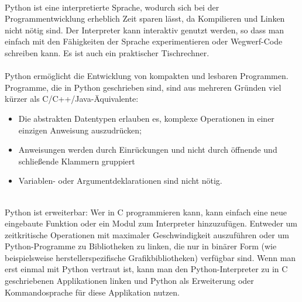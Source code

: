 \\
Python ist eine interpretierte Sprache, wodurch sich bei der Programmentwicklung erheblich Zeit sparen lässt, da Kompilieren und Linken nicht nötig sind. Der Interpreter kann interaktiv genutzt werden, so dass man einfach mit den Fähigkeiten der Sprache experimentieren oder Wegwerf-Code schreiben kann. Es ist auch ein praktischer Tischrechner.\\
\\
Python ermöglicht die Entwicklung von kompakten und lesbaren Programmen. Programme, die in Python geschrieben sind, sind aus mehreren Gründen viel kürzer als C/C++/Java-Äquivalente:\\

\begin{itemize}
\item Die abstrakten Datentypen erlauben es, komplexe Operationen in einer einzigen Anweisung auszudrücken;
\item Anweisungen werden durch Einrückungen und nicht durch öffnende und schließende Klammern gruppiert
\item Variablen- oder Argumentdeklarationen sind nicht nötig.
\end{itemize}
\ \\
Python ist erweiterbar: Wer in C programmieren kann, kann einfach eine neue eingebaute Funktion oder ein Modul zum Interpreter hinzuzufügen. Entweder um zeitkritische Operationen mit maximaler Geschwindigkeit auszuführen oder um Python-Programme zu Bibliotheken zu linken, die nur in binärer Form (wie beispielsweise herstellerspezifische Grafikbibliotheken) verfügbar sind. Wenn man erst einmal mit Python vertraut ist, kann man den Python-Interpreter zu in C geschriebenen Applikationen linken und Python als Erweiterung oder Kommandosprache für diese Applikation nutzen.\\

